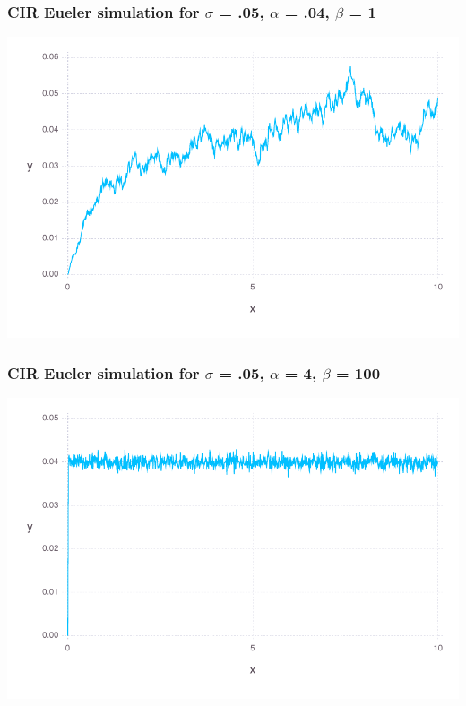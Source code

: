 \documentclass[a4paper,12pt]{article}
\begin{document}
\subsubsection{CIR Eueler simulation for $\sigma$ = .05, $\alpha$ = .04, $\beta$ = 1}
\includegraphics[width=\linewidth]{figures/problemset_8_1.pdf}



\subsubsection{CIR Eueler simulation for $\sigma$ = .05, $\alpha$ = 4, $\beta$ = 100}
\includegraphics[width=\linewidth]{figures/problemset_9_1.pdf}
\end{document}
